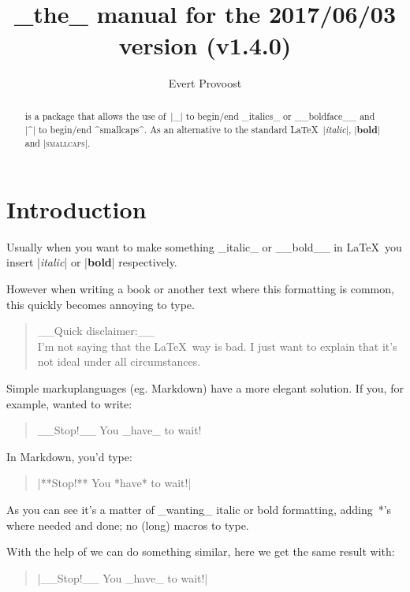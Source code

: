 \documentclass[11pt, cm-default]{l3doc}
\title{\pkg{easyformat}\\[.5em]
		\large _the_ manual for the 2017/06/03 version (v1.4.0)}
\author{Evert Provoost}
\date{}
\begin{document}
	\maketitle
	
	\begin{abstract}
		 is a package that allows the use of~|_| to begin/end _italics_ or __boldface__ and |^| to begin/end ^smallcaps^. As an alternative to the standard \LaTeX\ |\textit{italic}|, |\textbf{bold}| and |\textsc{smallcaps}|.
	\end{abstract}

	\tableofcontents
	\newpage
	
	
	\section{Introduction}
	Usually when you want to make something _italic_ or __bold__ in \LaTeX\ you insert |\textit{italic}| or |\textbf{bold}| respectively.
	
	However when writing a book or another text where this formatting is common, this quickly becomes annoying to type.

	\begin{quote}
	__Quick disclaimer:__\\
	I'm not saying that the \LaTeX\ way is bad. I just want to explain that it's not ideal under all circumstances.
	\end{quote}
	
	Simple markuplanguages (eg. Markdown) have a more elegant solution.	
	If you, for example, wanted to write:
	\begin{quote}
		__Stop!__ You _have_ to wait!
	\end{quote}

	In Markdown, you'd type:
	\begin{quote}
		|**Stop!** You *have* to wait!|
	\end{quote}

	As you can see it's a matter of _wanting_ italic or bold formatting, adding~*'s where needed and done; no (long) macros to type.
	
	With the help of  we can do something similar, here we get the same result with:
	\begin{quote}
		|__Stop!__ You _have_ to wait!|
	\end{quote}
	
\end{document}
